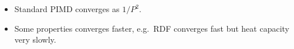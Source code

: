 \begin{frame}
\begin{multicols}{2}
\begin{itemize}
    \item Standard PIMD converges as $1/P^2$.
    \item Some properties converges faster, e.g.\ RDF converges fast but heat
      capacity very slowly.
    \end{itemize}

  \end{multicols}
\end{frame}

